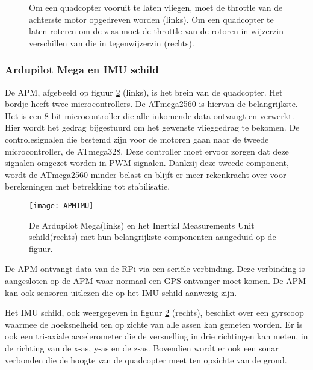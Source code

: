 \begin{figure}
	\begin{center}
		\hspace*{0.1\linewidth}
	\end{center}
	\centering
	\caption{Om een quadcopter vooruit te laten vliegen, moet de throttle van de achterste motor opgedreven worden (links). Om een quadcopter te laten roteren om de z-as moet de throttle van de rotoren in wijzerzin verschillen van die in tegenwijzerzin (rechts).}
	\label{fig:navigate}
\end{figure}

\subsubsection{Ardupilot Mega en IMU schild}
De APM, afgebeeld op figuur \ref{fig:APMIMU} (links), is het brein van de quadcopter. Het bordje heeft twee microcontrollers. De ATmega2560 is hiervan de belangrijkste. Het is een 8-bit microcontroller die alle inkomende data ontvangt en verwerkt. Hier wordt het gedrag bijgestuurd om het gewenste vlieggedrag te bekomen. De controlesignalen die bestemd zijn voor de motoren gaan naar de tweede microcontroller, de ATmega328. Deze controller moet ervoor zorgen dat deze signalen omgezet worden in PWM signalen. Dankzij deze tweede component, wordt de ATmega2560 minder belast en blijft er meer rekenkracht over voor berekeningen met betrekking tot stabilisatie.

\begin{figure}
	\centering
	\texttt{[image: APMIMU]}
	\caption{De Ardupilot Mega(links) en het Inertial Measurements Unit schild(rechts) met hun belangrijkste componenten aangeduid op de figuur.}
	\label{fig:APMIMU}
\end{figure}

\npar De APM ontvangt data van de RPi via een seri\"ele verbinding. Deze verbinding is aangesloten op de APM waar normaal een GPS ontvanger moet komen. De APM kan ook sensoren uitlezen die op het IMU schild aanwezig zijn.

\npar Het IMU schild, ook weergegeven in figuur \ref{fig:APMIMU} (rechts),  beschikt over een gyrscoop waarmee de hoeksnelheid ten op zichte van alle assen kan gemeten worden. Er is ook een tri-axiale accelerometer die de versnelling in drie richtingen kan meten, in de richting van de x-as, y-as en de z-as. Bovendien wordt er ook een sonar verbonden die de hoogte van de quadcopter meet ten opzichte van de grond.

